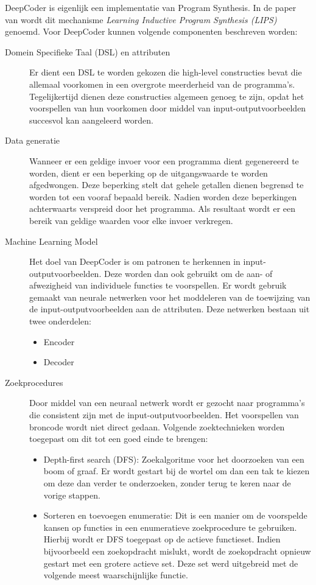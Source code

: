 DeepCoder is eigenlijk een implementatie van Program Synthesis. In de paper van \textcite{deepcoderpaper} wordt dit mechanisme \textit{Learning Inductive Program Synthesis (LIPS)} genoemd. Voor DeepCoder kunnen volgende componenten beschreven worden:
\begin{description}
	\item[Domein Specifieke Taal (DSL) en attributen] Er dient een DSL te worden gekozen die high-level constructies bevat die allemaal voorkomen in een overgrote meerderheid van de programma's. Tegelijkertijd dienen deze constructies algemeen genoeg te zijn, opdat het voorspellen van hun voorkomen door middel van input-outputvoorbeelden succesvol kan aangeleerd worden.
	\item[Data generatie] Wanneer er een geldige invoer voor een programma dient gegenereerd te worden, dient er een beperking op de uitgangswaarde te worden afgedwongen. Deze beperking stelt dat gehele getallen dienen begrensd te worden tot een vooraf bepaald bereik. Nadien worden deze beperkingen achterwaarts verspreid door het programma. Als resultaat wordt er een bereik van geldige waarden voor elke invoer verkregen.
	\item[Machine Learning Model] Het doel van DeepCoder is om patronen te herkennen in input-outputvoorbeelden. Deze worden dan ook gebruikt om de aan- of afwezigheid van individuele functies te voorspellen. Er wordt gebruik gemaakt van neurale netwerken voor het moddeleren van de toewijzing van de input-outputvoorbeelden aan de attributen. Deze netwerken bestaan uit twee onderdelen:
	\begin{itemize}
		\item Encoder
		\item Decoder
	\end{itemize}
	\item[Zoekprocedures] Door middel van een neuraal netwerk wordt er gezocht naar programma's die consistent zijn met de input-outputvoorbeelden. Het voorspellen van broncode wordt niet direct gedaan. Volgende zoektechnieken worden toegepast om dit tot een goed einde te brengen:
	\begin{itemize}
		\item Depth-first search (DFS): Zoekalgoritme voor het doorzoeken van een boom of graaf. Er wordt gestart bij de wortel om dan een tak te kiezen om deze dan verder te onderzoeken, zonder terug te keren naar de vorige stappen.
		\item Sorteren en toevoegen enumeratie:  Dit is een manier om de voorspelde kansen op functies in een enumeratieve zoekprocedure te gebruiken. Hierbij wordt er DFS toegepast op de actieve functieset. Indien bijvoorbeeld een zoekopdracht mislukt, wordt de zoekopdracht opnieuw gestart met een grotere actieve set. Deze set werd uitgebreid met de volgende meest waarschijnlijke functie.

\end{itemize}
\end{description}

